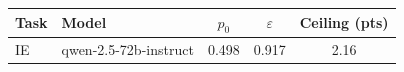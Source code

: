 \begin{tabular}{@{}ll ccc@{}}
\toprule
Task & Model & $p_0$ & $\varepsilon$ & Ceiling (pts) \\
\midrule
IE & qwen-2.5-72b-instruct & 0.498 & 0.917 & 2.16 \\
\bottomrule
\end{tabular}
